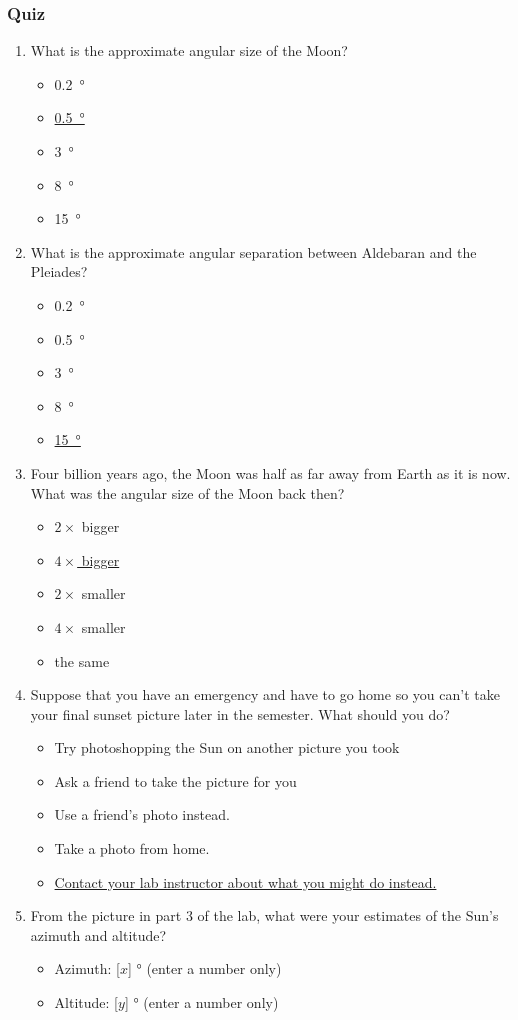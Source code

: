 \documentclass[12pt]{article}
\begin{document}
\subsubsection{Quiz}
\begin{enumerate}
\item
What is the approximate angular size of the Moon?
\begin{itemize}
    \item \SI{0.2}{\degree}
    \item \underline{\SI{0.5}{\degree}}
    \item \SI{3}{\degree}
    \item \SI{8}{\degree}
    \item \SI{15}{\degree}
\end{itemize}
\item
What is the approximate angular separation between Aldebaran and the Pleiades?
\begin{itemize}
    \item \SI{0.2}{\degree}
    \item \SI{0.5}{\degree}
    \item \SI{3}{\degree}
    \item \SI{8}{\degree}
    \item \underline{\SI{15}{\degree}}
\end{itemize}
\item
Four billion years ago, the Moon was half as far away from Earth as it is now. What was the angular size of the Moon back then?
\begin{itemize}
    \item $2\times$ bigger
    \item \underline{$4\times$ bigger}
    \item $2\times$ smaller
    \item $4\times$ smaller
    \item the same 
\end{itemize}
\item
Suppose that you have an emergency and have to go home so you can't take your final sunset picture later in the semester. What should you do?
\begin{itemize}
    \item Try photoshopping the Sun on another picture you took
    \item Ask a friend to take the picture for you
    \item Use a friend's photo instead.
    \item Take a photo from home.
    \item \underline{Contact your lab instructor about what you might do instead.}
\end{itemize}
\item%
From the picture in part 3 of the lab, what were your estimates of the Sun's azimuth and altitude?
\begin{itemize}
    \item Azimuth: [$x$] \si{\degree} (enter a number only)
    \item Altitude: [$y$] \si{\degree} (enter a number only)
\end{itemize}
\end{enumerate}
\end{document}
